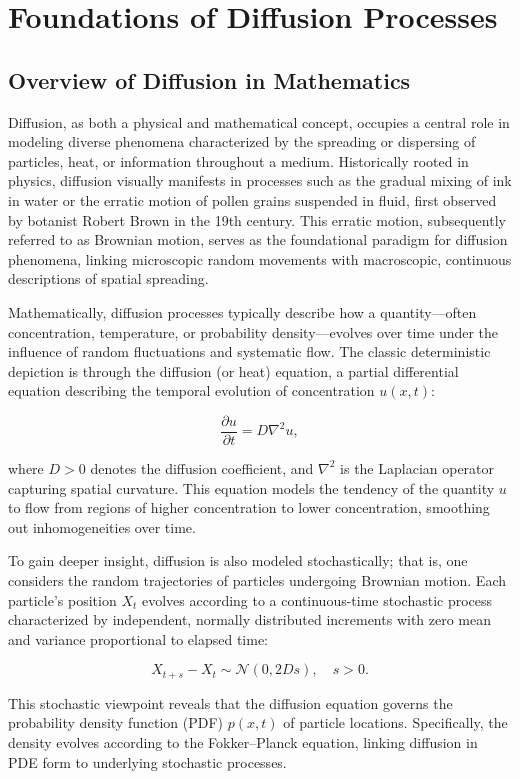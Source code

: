 \chapter{Foundations of Diffusion Processes}

\section{Overview of Diffusion in Mathematics}

Diffusion, as both a physical and mathematical concept, occupies a central role in modeling diverse phenomena characterized by the spreading or dispersing of particles, heat, or information throughout a medium. Historically rooted in physics, diffusion visually manifests in processes such as the gradual mixing of ink in water or the erratic motion of pollen grains suspended in fluid, first observed by botanist Robert Brown in the 19th century. This erratic motion, subsequently referred to as Brownian motion, serves as the foundational paradigm for diffusion phenomena, linking microscopic random movements with macroscopic, continuous descriptions of spatial spreading.

Mathematically, diffusion processes typically describe how a quantity—often concentration, temperature, or probability density—evolves over time under the influence of random fluctuations and systematic flow. The classic deterministic depiction is through the diffusion (or heat) equation, a partial differential equation describing the temporal evolution of concentration \( u(x,t) \):

\[
\frac{\partial u}{\partial t} = D \nabla^2 u,
\]

where \( D > 0 \) denotes the diffusion coefficient, and \( \nabla^2 \) is the Laplacian operator capturing spatial curvature. This equation models the tendency of the quantity \( u \) to flow from regions of higher concentration to lower concentration, smoothing out inhomogeneities over time.

To gain deeper insight, diffusion is also modeled stochastically; that is, one considers the random trajectories of particles undergoing Brownian motion. Each particle's position \( X_t \) evolves according to a continuous-time stochastic process characterized by independent, normally distributed increments with zero mean and variance proportional to elapsed time:

\[
X_{t+s} - X_t \sim \mathcal{N}(0, 2Ds), \quad s > 0.
\]

This stochastic viewpoint reveals that the diffusion equation governs the probability density function (PDF) \( p(x,t) \) of particle locations. Specifically, the density evolves according to the Fokker–Planck equation, linking diffusion in PDE form to underlying stochastic processes.

